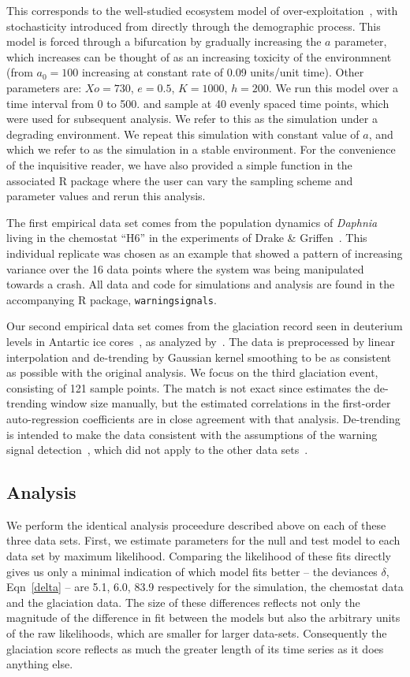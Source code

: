 \documentclass[authoryear,review,11pt]{elsarticle}
\begin{document}
This corresponds to the well-studied ecosystem model of over-exploitation~\citep{Noy-Meir1975, May1977}, 
with stochasticity introduced from directly through the demographic process.   
This model is forced through a bifurcation by gradually increasing the $a$ parameter,
which increases can be thought of as an increasing toxicity of the environmnent
(from $a_0 = 100$ increasing at constant rate of 0.09 units/unit time).  
Other parameters are: $Xo = 730$, $e = 0.5$, $K = 1000$, $h = 200$.  
We run this model over a time interval from 0 to 500.  
and sample at 40 evenly spaced time points, which were used for subsequent analysis.
We refer to this as the simulation under a degrading environment.
We repeat this simulation with constant value of $a$, and which we refer to as the simulation in a stable environment.  
For the convenience of the inquisitive reader, we have also provided a simple function in the 
associated R package where the user can vary the sampling scheme and parameter values and rerun this analysis.  

The first empirical data set comes from the population dynamics of 
\emph{Daphnia} living in the chemostat ``H6'' in the experiments of Drake \& Griffen~\citep{Drake2010}. 
This individual replicate was chosen as an example that showed 
a pattern of increasing variance over the 16 data points where the system was being manipulated towards a crash.
All data and code for simulations and analysis are found in the accompanying R package, \verb|warningsignals|.  

Our second empirical data set comes from the glaciation record seen in deuterium levels in Antartic ice cores~\citep{Petit1999}, 
as analyzed by~\citet{Dakos2008}.
The data is preprocessed by linear interpolation and de-trending by Gaussian kernel smoothing 
to be as consistent as possible with the original analysis.
We focus on the third glaciation event, consisting of 121 sample points. 
The match is not exact since estimates the de-trending window size manually,
but the estimated correlations in the first-order auto-regression coefficients are in close agreement with that analysis. 
De-trending is intended to make the data consistent with the assumptions of the warning signal detection~\citep{Dakos2008}, 
which did not apply to the other data sets~\citep{Drake2010}.  

\subsection*{Analysis}
We perform the identical analysis proceedure described above on each of these three data sets.
First, we estimate parameters for the null and test model to each data set by maximum likelihood.
Comparing the likelihood of these fits directly gives us only a minimal indication of which model fits better --
the deviances $\delta$, Eqn~\eqref{delta} -- are 5.1, 6.0, 83.9 respectively for the simulation,
the chemostat data and the glaciation data. 
The size of these differences reflects not only the magnitude of the difference in fit
between the models but also the arbitrary units of the raw likelihoods,
which are smaller for larger data-sets.  
Consequently the glaciation score reflects as much the greater length of its time series as it does anything else.  
\end{document}
